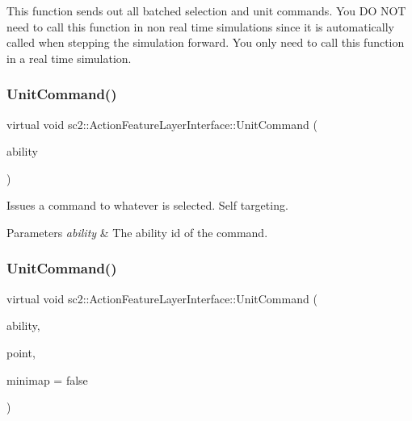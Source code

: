 This function sends out all batched selection and unit commands. You DO N\+OT need to call this function in non real time simulations since it is automatically called when stepping the simulation forward. You only need to call this function in a real time simulation. \mbox{\label{classsc2_1_1_action_feature_layer_interface_a425ea9449bdde698047f2b32eae44f62}} 
\subsubsection{\texorpdfstring{Unit\+Command()}{UnitCommand()}\hspace{0.1cm}{\footnotesize\ttfamily [1/2]}}
{\footnotesize\ttfamily virtual void sc2\+::\+Action\+Feature\+Layer\+Interface\+::\+Unit\+Command (\begin{DoxyParamCaption}\item[{\hyperlink{classsc2_1_1_s_c2_type}{Ability\+ID}}]{ability }\end{DoxyParamCaption})\hspace{0.3cm}{\ttfamily [pure virtual]}}

Issues a command to whatever is selected. Self targeting. 
\begin{DoxyParams}{Parameters}
{\em ability} & The ability id of the command. \\
\hline
\end{DoxyParams}
\mbox{\label{classsc2_1_1_action_feature_layer_interface_a8d58e436d717242917645d27e772999f}} 
\subsubsection{\texorpdfstring{Unit\+Command()}{UnitCommand()}\hspace{0.1cm}{\footnotesize\ttfamily [2/2]}}
{\footnotesize\ttfamily virtual void sc2\+::\+Action\+Feature\+Layer\+Interface\+::\+Unit\+Command (\begin{DoxyParamCaption}\item[{\hyperlink{classsc2_1_1_s_c2_type}{Ability\+ID}}]{ability,  }\item[{const \hyperlink{structsc2_1_1_point2_d_i}{Point2\+DI} \&}]{point,  }\item[{bool}]{minimap = {\ttfamily false} }\end{DoxyParamCaption})\hspace{0.3cm}{\ttfamily [pure virtual]}}

